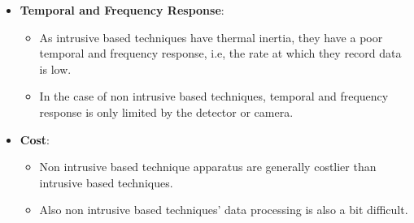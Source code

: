 \documentclass{article}
\begin{document}
\begin{itemize}
		\item \textbf{Temporal and Frequency Response}:
		\begin{itemize}
			\item As intrusive based techniques have thermal inertia, they have a poor temporal and frequency response, i.e, the rate at which they record data is low.
			\item In the case of non intrusive based techniques, temporal and frequency response is only limited by the detector or camera.
		\end{itemize}

		\item \textbf{Cost}:
		\begin{itemize}
			\item Non intrusive based technique apparatus are generally costlier than intrusive based techniques.
			\item Also non intrusive based techniques' data processing is also a bit difficult.
		\end{itemize}

	\end{itemize}
\end{document}
